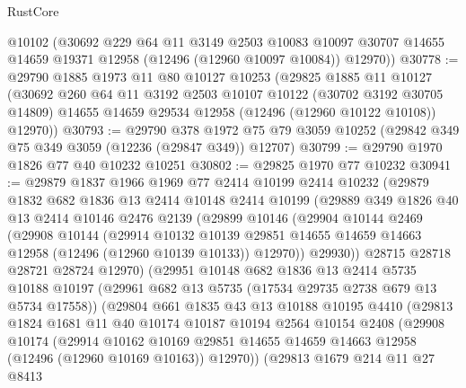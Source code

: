 \begin{lexlean}{RustCore}
\begin{coremodule}
      @10102
      (@30692
        @229
        @64
        @11
        @3149
        @2503
        @10083
        @10097
        @30707
        @14655
        @14659
        @19371
        @12958
        (@12496 (@12960 @10097 @10084))
        @12970))
@30778 := @29790
    @1885
    @1973
    @11
    @80
    @10127
    @10253
    (@29825
      @1885
      @11
      @10127
      (@30692
        @260
        @64
        @11
        @3192
        @2503
        @10107
        @10122
        (@30702 @3192 @30705 @14809)
        @14655
        @14659
        @29534
        @12958
        (@12496 (@12960 @10122 @10108))
        @12970))
@30793 := @29790
    @378
    @1972
    @75
    @79
    @3059
    @10252
    (@29842 @349 @75 @349 @3059 (@12236 (@29847 @349)) @12707)
@30799 := @29790 @1970 @1826 @77 @40 @10232 @10251
@30802 := @29825 @1970 @77 @10232
@30941 := @29879
    @1837
    @1966
    @1969
    @77
    @2414
    @10199
    @2414
    @10232
    (@29879
      @1832
      @682
      @1836
      @13
      @2414
      @10148
      @2414
      @10199
      (@29889
        @349
        @1826
        @40
        @13
        @2414
        @10146
        @2476
        @2139
        (@29899
          @10146
          (@29904
            @10144
            @2469
            (@29908
              @10144
              (@29914
                @10132
                @10139
                @29851
                @14655
                @14659
                @14663
                @12958
                (@12496 (@12960 @10139 @10133))
                @12970))
            @29930))
        @28715
        @28718
        @28721
        @28724
        @12970)
      (@29951
        @10148
        @682
        @1836
        @13
        @2414
        @5735
        @10188
        @10197
        (@29961 @682 @13 @5735 (@17534 @29735 @2738 @679 @13 @5734 @17558))
        (@29804
          @661
          @1835
          @43
          @13
          @10188
          @10195
          @4410
          (@29813
            @1824
            @1681
            @11
            @40
            @10174
            @10187
            @10194
            @2564
            @10154
            @2408
            (@29908
              @10174
              (@29914
                @10162
                @10169
                @29851
                @14655
                @14659
                @14663
                @12958
                (@12496 (@12960 @10169 @10163))
                @12970))
            (@29813
              @1679
              @214
              @11
              @27
              @8413

\end{coremodule}
\end{lexlean}
